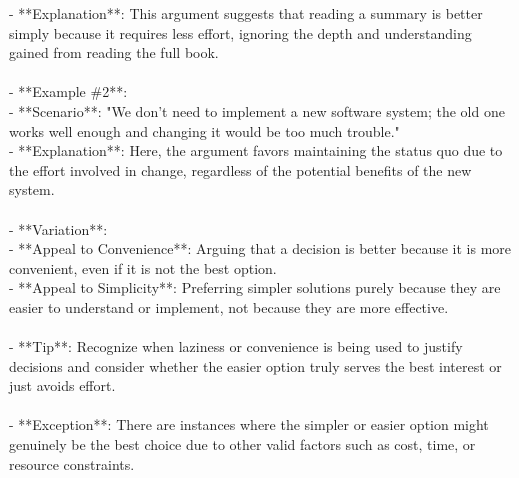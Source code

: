 \documentclass[a4paper,12pt,single,pdftex]{scrbook}
\begin{document}
    
        - **Explanation**: This argument suggests that reading a summary is better simply because it requires less effort, ignoring the depth and understanding gained from reading the full book.
    \\

    
      
    \\

    
      - **Example \#2**:
    \\

    
        - **Scenario**: "We don't need to implement a new software system; the old one works well enough and changing it would be too much trouble."
    \\

    
        - **Explanation**: Here, the argument favors maintaining the status quo due to the effort involved in change, regardless of the potential benefits of the new system.
    \\

    
      
    \\

    
      - **Variation**:
    \\

    
        - **Appeal to Convenience**: Arguing that a decision is better because it is more convenient, even if it is not the best option.
    \\

    
        - **Appeal to Simplicity**: Preferring simpler solutions purely because they are easier to understand or implement, not because they are more effective.
    \\

    
      
    \\

    
      - **Tip**: Recognize when laziness or convenience is being used to justify decisions and consider whether the easier option truly serves the best interest or just avoids effort.
    \\

    
      
    \\

    
      - **Exception**: There are instances where the simpler or easier option might genuinely be the best choice due to other valid factors such as cost, time, or resource constraints.
    \\
\end{document}
